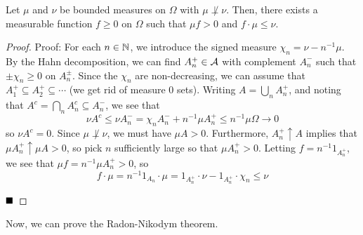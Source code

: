 
\begin{lemma}
    Let $\mu$ and $\nu$ be bounded measures on $\Omega$ with $\mu \not\perp \nu$. Then, there exists a measurable function $f \geq 0$ on $\Omega$ such that $\mu f > 0$ and $f \cdot \mu \leq \nu$.
\end{lemma}
\begin{proof}{Proof:}
    For each $n \in \N$, we introduce the signed measure $\chi_n = \nu - n^{-1}\mu$. By the Hahn decomposition, we can find $A_n^{+} \in \cal{A}$ with complement $A_n^{-}$ such that $\pm \chi_n \geq 0$ on $A_n^{\pm}$. Since the $\chi_n$ are non-decreasing, we can assume that $A_1^{+} \subseteq A_2^{+} \subseteq \cdots$ (we get rid of measure $0$ sets). Writing $A = \bigcup_{n} A_n^{+}$, and noting that $A^{c} = \bigcap_{n} A_n^{c} \subseteq A_n^{-}$, we see that
    \[ \nu A^{c} \leq \nu A_n^{-} = \chi_n A_n^{-} + n^{-1}\mu A_n^{+} \leq n^{-1}\mu\Omega \to 0 \]
    so $\nu A^{c} = 0$. Since $\mu \not\perp \nu$, we must have $\mu A > 0$. Furthermore, $A_n^{+} \uparrow A$ implies that $\mu A_n^{+} \uparrow \mu A > 0$, so pick $n$ sufficiently large so that $\mu A_n^{+} > 0$. Letting $f = n^{-1}1_{A_n^{+}}$, we see that $\mu f = n^{-1}\mu A_n^{+} > 0$, so
    \[ f \cdot \mu = n^{-1}1_{A_n} \cdot \mu = 1_{A_n^{+}} \cdot \nu - 1_{A_n^{+}} \cdot \chi_n \leq \nu \]

    $\qed$
\end{proof}
Now, we can prove the Radon-Nikodym theorem. 
\vspace{2cm}

